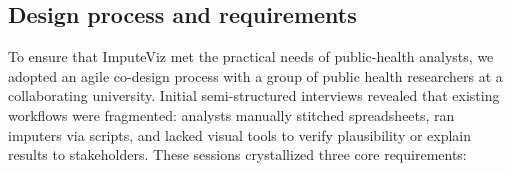 \documentclass{egpubl}
\newcommand{\gknn}{gKNN\xspace}
\newcommand{\tool}{ImputeViz\xspace}
\begin{document}



\subsection{Design process and requirements}
To ensure that \tool met the practical needs of public-health analysts, we adopted an agile co-design process with a group of public health researchers at a collaborating university. Initial semi-structured interviews revealed that existing workflows were fragmented: analysts manually stitched spreadsheets, ran imputers via scripts, and lacked visual tools to verify plausibility or explain results to stakeholders. These sessions crystallized three core requirements:
\end{document}
